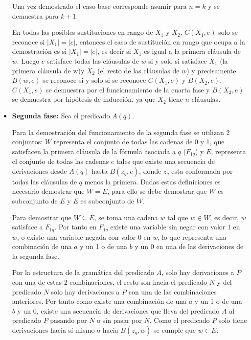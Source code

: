 \begin{itemize}
          Una vez demostrado el caso base corresponde asumir para $n=k$ y se demuestra para $k+1$.

          En todas las posibles sustituciones en rango de $X_1$ y $X_2$, $C(X_1,e)$ solo se reconoce si $|X_1|=|e|$,
          entonces el caso de sustitución en rango que ocupa a la demostración es si $|X_1|=|e|$, es decir si $X_1$ es igual a
          la primera cláusula de $w$. Luego $e$ satisface todas las cláusulas de $w$ si y solo si satisface $X_1$
          (la primera cláusula de w)y $X_2$ (el resto de las cláusulas de $w$) y precisamente $B(w,e)$ se reconoce si y
          solo si se reconoce $C(X_1,e)$ y $B(X_2,e)$. $C(X_1,e)$ se demuestra por el funcionamiento de la cuarta fase
          y $B(X_2,e)$ se demuestra por hipótesis de inducción, ya que $X_2$ tiene $n$ cláusulas.

    \item \textbf{Segunda fase:} Sea el predicado $A(q)$.

          Para la demostración del funcionamiento de la segunda fase se utilizan 2 conjuntos: $W$ representa el
          conjunto de todas las cadenas de 0 y 1, que satisfacen la primera cláusula de la fórmula asociada a
          $q$ ($F_{1q}$) y $E$, representa el conjunto de todas las cadenas $e$ tales que existe una secuencia
          de derivaciones desde $A(q)$ hasta $B(z_q,e)$, donde $z_q$ esta conformada por todas las cláusulas de
          $q$ menos la primera. Dadas estas definiciones es necesario demostrar que $W=E$, para ello se debe
          demostrar que $W$ es subconjunto de $E$ y $E$ es subconjunto de  $W$.

          Para demostrar que $W\subseteq E$, se toma una cadena $w$ tal que $w\in W$, es decir, $w$ satisface
          a $F_{1q}$. Por tanto en $F_{1q}$ existe una variable sin negar con valor 1 en $w$, o existe una
          variable negada con valor 0 en $w$, lo que representa una combinación de una $a$ y un 1 o de una $b$
          y un 0 en una de las derivaciones de la segunda fase.

          Por la estructura de la gramática del predicado $A$, solo hay derivaciones a $P$ con una de estas 2
          combinaciones, el resto son hacia el predicado $N$ y del predicado $N$ solo hay derivaciones a $P$
          con una de las combinaciones anteriores. Por tanto como existe una combinación de una $a$ y un 1 o
          de una $b$ y un 0, existe una secuencia de derivaciones que lleva del predicado $A$ al predicado
          $P$ pasando por $N$ o sin pasar por $N$. Como el predicado $P$ solo tiene derivaciones hacia sí
          mismo o hacia $B(z_q,w)$ se cumple que $w\in E$.


\end{itemize}

